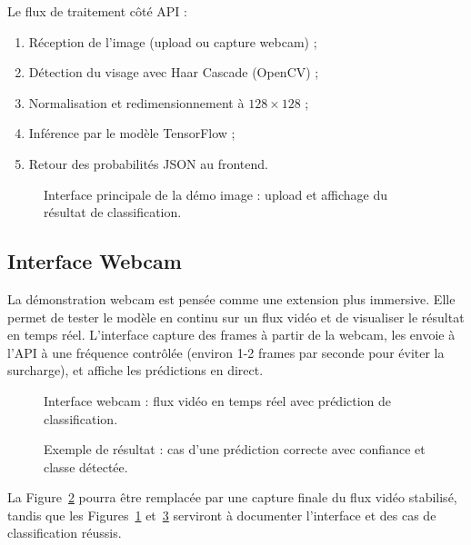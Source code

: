 \documentclass[11pt,a4paper]{article}
\begin{document}
Le flux de traitement côté API :
\begin{enumerate}
    \item Réception de l'image (upload ou capture webcam) ;
    \item Détection du visage avec Haar Cascade (OpenCV) ;
    \item Normalisation et redimensionnement à $128 \times 128$ ;
    \item Inférence par le modèle TensorFlow ;
    \item Retour des probabilités JSON au frontend.
\end{enumerate}

\begin{figure}[H]
\centering
{}
\caption{Interface principale de la démo image : upload et affichage du résultat de classification.}
\label{fig:demo-main}
\end{figure}

\subsection{Interface Webcam}

La démonstration webcam est pensée comme une extension plus immersive. Elle permet de tester le modèle en continu sur un flux vidéo et de visualiser le résultat en temps réel. L'interface capture des frames à partir de la webcam, les envoie à l'API à une fréquence contrôlée (environ 1-2 frames par seconde pour éviter la surcharge), et affiche les prédictions en direct.

\begin{figure}[H]
\centering
{}
\caption{Interface webcam : flux vidéo en temps réel avec prédiction de classification.}
\label{fig:demo-webcam}
\end{figure}

\begin{figure}[H]
\centering
{}
\caption{Exemple de résultat : cas d'une prédiction correcte avec confiance et classe détectée.}
\label{fig:demo-prediction}
\end{figure}

La Figure~\ref{fig:demo-webcam} pourra être remplacée par une capture finale du flux vidéo stabilisé, tandis que les Figures~\ref{fig:demo-main} et~\ref{fig:demo-prediction} serviront à documenter l'interface et des cas de classification réussis.
\end{document}

